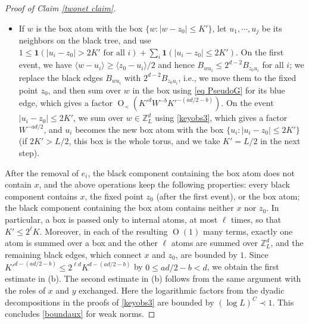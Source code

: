 \documentclass{article}
\newcommand{\1}{\mathds{1}}
\numberwithin{equation}{section}
\renewcommand{\cal}{\mathcal}
\renewcommand{\leq}{\leqslant}
\renewcommand{\geq}{\geqslant}
\renewcommand{\le}{\leq}
\renewcommand{\ge}{\geq}
\newcommand{\Z}{\mathbb{Z}}
\DeclareMathOperator{\OO}{O}
\theoremstyle{plain} %
\theoremstyle{remark}
\newtheorem{remark}[theorem]{Remark}
\newcommand{\cor}{\color{red}}
\newcommand{\nc}{\normalcolor}
\begin{document}
\begin{proof}[Proof of Claim \ref{twonet claim}]
\begin{itemize}
\item If $w$ is the box atom with the box $\{w:|w-z_0|\le K'\}$, let $u_1,\cdots, u_j$ be its neighbors on the black tree, and use $1\le \mathbf 1(|u_i-z_0|>2K' \text{ for all } i)+\sum_{i}\mathbf 1(|u_i-z_0|\le 2K')$. On the first event, we have $\langle w-u_i\rangle\ge \langle z_0-u_i\rangle/2$ and hence $B_{wu_i}\le 2^{d-2}B_{z_0u_i}$ for all $i$; we replace the black edges $B_{wu_i}$ with $2^{d-2}B_{z_0u_i}$, i.e., we move them to the fixed point $z_0$, and then sum over $w$ in the box using \eqref{eq PseudoG} for its blue edge, which gives a factor $\OO_\prec(K'^dW^{-b}K'^{-(ad/2-b)})$. On the event $|u_i-z_0|\le 2K'$, we sum over $w\in \Z_L^d$ using \eqref{keyobs3}, which gives a factor $W^{-ad/2}$, and $u_i$ becomes the new box atom with the box $\{u_i:|u_i-z_0|\le 2K'\}$ (if $2K'>L/2$, this box is the whole torus, and we take $K'=L/2$ in the next step). 
\end{itemize}
After the removal of $e_i$, the black component containing the box atom does not contain $x$, and the above operations keep the following properties: every black component contains $x$, the fixed point $z_0$ (after the first event), or the box atom; the black component containing the box atom contains neither $x$ nor $z_0$. In particular, a box is passed only to internal atoms, at most $\ell$ times, so that $K'\le 2^\ell K$. Moreover, in each of the resulting $\OO(1)$ many terms, exactly one atom is summed over a box and the other $\ell$ atoms are summed over $\Z_L^d$, and the remaining black edges, which connect $x$ and $z_0$, are bounded by $1$. Since $K'^{d-(ad/2-b)}\le 2^{\ell d}K^{d-(ad/2-b)}$ by $0\le ad/2-b<d$, we obtain the first estimate in (b). The second estimate in (b) follows from the same argument with the roles of $x$ and $y$ exchanged. Here the logarithmic factors from the dyadic decompositions in the proofs of \eqref{keyobs3} are bounded by $(\log L)^C\prec 1$. This concludes \eqref{boundaux} for weak norms.
\end{proof}

 
\end{document}
